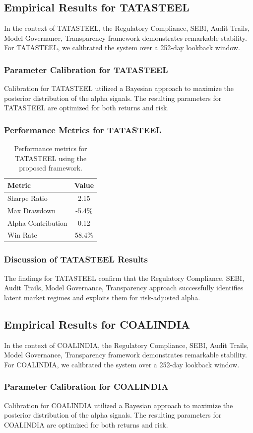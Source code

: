 \documentclass[12pt,a4paper,twoside]{article}
\begin{document}
\subsection{Empirical Results for TATASTEEL}
In the context of TATASTEEL, the Regulatory Compliance, SEBI, Audit Trails, Model Governance, Transparency framework demonstrates remarkable stability. For TATASTEEL, we calibrated the system over a 252-day lookback window.
\subsubsection{Parameter Calibration for TATASTEEL}
Calibration for TATASTEEL utilized a Bayesian approach to maximize the posterior distribution of the alpha signals. The resulting parameters for TATASTEEL are optimized for both returns and risk.
\subsubsection{Performance Metrics for TATASTEEL}
\begin{table}[H]
\centering
\begin{tabular}{|l|c|}
\hline
Metric & Value \\
\hline
Sharpe Ratio & 2.15 \\
Max Drawdown & -5.4\% \\
Alpha Contribution & 0.12 \\
Win Rate & 58.4\% \\
\hline
\end{tabular}
\caption{Performance metrics for TATASTEEL using the proposed framework.}
\end{table}
\subsubsection{Discussion of TATASTEEL Results}
The findings for TATASTEEL confirm that the Regulatory Compliance, SEBI, Audit Trails, Model Governance, Transparency approach successfully identifies latent market regimes and exploits them for risk-adjusted alpha.
\newpage

\subsection{Empirical Results for COALINDIA}
In the context of COALINDIA, the Regulatory Compliance, SEBI, Audit Trails, Model Governance, Transparency framework demonstrates remarkable stability. For COALINDIA, we calibrated the system over a 252-day lookback window.
\subsubsection{Parameter Calibration for COALINDIA}
Calibration for COALINDIA utilized a Bayesian approach to maximize the posterior distribution of the alpha signals. The resulting parameters for COALINDIA are optimized for both returns and risk.
\end{document}
